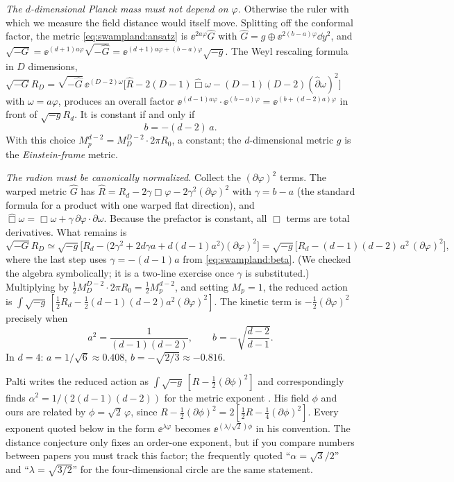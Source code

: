 \emph{The $d$-dimensional Planck mass must not depend on $\varphi$.} Otherwise the ruler with which
we measure the field distance would itself move. Splitting off the conformal factor, the metric
\eqref{eq:swampland:ansatz} is $\ee^{2a\varphi}\hat G$ with $\hat G=g\oplus\ee^{2(b-a)\varphi}\dd y^2$,
and $\sqrt{-G}=\ee^{(d+1)a\varphi}\sqrt{-\hat G}=\ee^{(d+1)a\varphi+(b-a)\varphi}\sqrt{-g}$. The Weyl
rescaling formula in $D$ dimensions, $\sqrt{-G}R_D=\sqrt{-\hat G}\,\ee^{(D-2)\omega}\big[\hat R
-2(D-1)\hat\Box\omega-(D-1)(D-2)(\hat\partial\omega)^2\big]$ with $\omega=a\varphi$, produces an
overall factor $\ee^{(d-1)a\varphi}\cdot\ee^{(b-a)\varphi}=\ee^{(b+(d-2)a)\varphi}$ in front of
$\sqrt{-g}R_d$. It is constant if and only if
\begin{equation}\label{eq:swampland:beta}
b=-(d-2)\,a .
\end{equation}
With this choice $M_p^{d-2}=M_D^{D-2}\cdot 2\pi R_0$, a constant; the $d$-dimensional metric $g$ is
the \emph{Einstein-frame} metric.

\emph{The radion must be canonically normalized.} Collect the $(\partial\varphi)^2$ terms. The
warped metric $\hat G$ has $\hat R=R_d-2\gamma\Box\varphi-2\gamma^2(\partial\varphi)^2$ with
$\gamma=b-a$ (the standard formula for a product with one warped flat direction), and
$\hat\Box\omega=\Box\omega+\gamma\,\partial\varphi\cdot\partial\omega$. Because the prefactor is
constant, all $\Box$ terms are total derivatives. What remains is
\[
\sqrt{-G}R_D \simeq \sqrt{-g}\big[R_d-\big(2\gamma^2+2d\gamma a+d(d-1)a^2\big)(\partial\varphi)^2\big]
= \sqrt{-g}\big[R_d-(d-1)(d-2)\,a^2\,(\partial\varphi)^2\big],
\]
where the last step uses $\gamma=-(d-1)a$ from \eqref{eq:swampland:beta}. (We checked the
algebra symbolically; it is a two-line exercise once $\gamma$ is substituted.) Multiplying by
$\tfrac12M_D^{D-2}\cdot2\pi R_0=\tfrac12M_p^{d-2}$, and setting $M_p=1$, the reduced action is
$\int\sqrt{-g}\,[\tfrac12R_d-\tfrac12(d-1)(d-2)a^2(\partial\varphi)^2]$. The kinetic term is
$-\tfrac12(\partial\varphi)^2$ precisely when
\begin{equation}\label{eq:swampland:alpha}
a^2=\frac{1}{(d-1)(d-2)},\qquad b=-\sqrt{\frac{d-2}{d-1}} .
\end{equation}
In $d=4$: $a=1/\sqrt6\approx0.408$, $b=-\sqrt{2/3}\approx-0.816$.

\begin{pitfallbox}
Palti writes the reduced action as $\int\sqrt{-g}\,[R-\tfrac12(\partial\phi)^2]$ and correspondingly
finds $\alpha^2=1/(2(d-1)(d-2))$ for the metric exponent . His
field $\phi$ and ours are related by $\phi=\sqrt2\,\varphi$, since $R-\tfrac12(\partial\phi)^2
=2[\tfrac12R-\tfrac14(\partial\phi)^2]$. Every exponent quoted below in the form $\ee^{\lambda\varphi}$
becomes $\ee^{(\lambda/\sqrt2)\phi}$ in his convention. The distance conjecture only fixes an
order-one exponent, but if you compare numbers between papers you must track this factor; the
frequently quoted ``$\alpha=\sqrt3/2$'' and ``$\lambda=\sqrt{3/2}$'' for the four-dimensional circle
are the same statement.
\end{pitfallbox}

